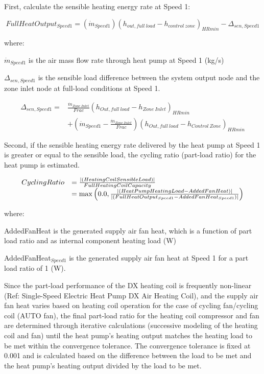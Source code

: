 First, calculate the sensible heating energy rate at Speed 1:

\begin{equation}
FullHeatOutpu{t_{Speed1}} = \left( {{{\dot m}_{Speed1}}} \right){\left( {{h_{out,full~load}} - {h_{control~zone}}} \right)_{HRmin}} - {\Delta_{sen,Speed1}}
\end{equation}

where:

\({{{\dot m}_{Speed1}}}\) is the air mass flow rate through heat pump at Speed 1 (kg/s)

\(\Delta_{sen,Speed1}\) is the sensible load difference between the system output node and the zone inlet node at full-load conditions at Speed 1.

\begin{equation}
\begin{array}{rl}
{\Delta_{sen,Speed1}} =& \frac{{{{\dot m}_{Zone~Inlet}}}}{{Frac}}{\left( {{h_{Out,full~load}} - {h_{Zone~Inlet}}} \right)_{HRmin}} \\
 & + \left( {{{\dot m}_{Speed1}} - \frac{{{{\dot m}_{Zone~Inlet}}}}{{Frac}}} \right){\left( {{h_{Out,full~load}} - {h_{Control~Zone}}} \right)_{HRmin}}
\end{array}
\end{equation}

Second, if the sensible heating energy rate delivered by the heat pump at Speed 1 is greater or equal to the sensible load, the cycling ratio (part-load ratio) for the heat pump is estimated.

\begin{equation}
  \begin{array}{rl}
    CyclingRatio &= \frac{\left|\PB{HeatingCoilSensibleLoad}\right|}{FullHeatingCoilCapacity} \\
                 &= \max \PB{0.0, \frac{\left|\PB{HeatPumpHeatingLoad-AddedFanHeat}\right|}{\left|\PB{FullHeatOutput_{Speed1}-AddedFanHeat_{Speed1}}\right|} }
  \end{array}
\label{eq:UnitaryMultiSpeedCyclingRatioHeating}
\end{equation}

where:

AddedFanHeat is the generated supply air fan heat, which is a function of part load ratio and as internal component heating load (W)

AddedFanHeat\(_{Speed1}\) is the generated supply air fan heat at Speed 1 for a part load ratio of 1 (W).

Since the part-load performance of the DX heating coil is frequently non-linear (Ref: Single-Speed Electric Heat Pump DX Air Heating Coil), and the supply air fan heat varies based on heating coil operation for the case of cycling fan/cycling coil (AUTO fan), the final part-load ratio for the heating coil compressor and fan are determined through iterative calculations (successive modeling of the heating coil and fan) until the heat pump's heating output matches the heating load to be met within the convergence tolerance. The convergence tolerance is fixed at 0.001 and is calculated based on the difference between the load to be met and the heat pump's heating output divided by the load to be met.

